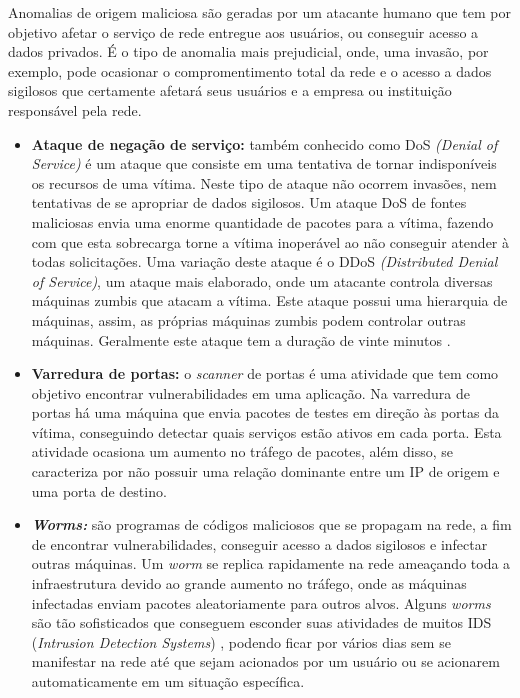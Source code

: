   \indent Anomalias de origem maliciosa são geradas por um atacante humano que tem por objetivo afetar o serviço de rede entregue aos usuários, ou conseguir acesso a dados privados. É o tipo de anomalia mais prejudicial, onde, uma invasão, por exemplo, pode ocasionar o compromentimento total da rede e o acesso a dados sigilosos que certamente afetará seus usuários e a empresa ou instituição responsável pela rede.
  \begin{itemize}
  \item \textbf{Ataque de negação de serviço:} também conhecido como DoS \textit{(Denial of Service)} é um ataque que consiste em uma tentativa de tornar indisponíveis os recursos de uma vítima. Neste tipo de ataque não ocorrem invasões, nem tentativas de se apropriar de dados sigilosos. Um ataque DoS de fontes maliciosas envia uma enorme quantidade de pacotes para a vítima, fazendo com que esta sobrecarga  torne a vítima inoperável ao não conseguir atender à todas solicitações. Uma variação deste ataque é o DDoS \textit{(Distributed Denial of Service)}, um ataque mais elaborado, onde um atacante controla diversas máquinas zumbis que atacam a vítima. Este ataque possui uma hierarquia de máquinas, assim, as próprias máquinas zumbis podem controlar outras máquinas. Geralmente este ataque tem a duração de vinte minutos \cite{Lakhina:2004}.
  \item \textbf{Varredura de portas:} o \textit{scanner} de portas é uma atividade que tem como objetivo encontrar vulnerabilidades em uma aplicação. Na varredura de portas há uma máquina que envia pacotes de testes em direção às portas da vítima, conseguindo detectar quais serviços estão ativos em cada porta. Esta atividade ocasiona um aumento no tráfego de pacotes, além disso, se caracteriza por não possuir uma relação dominante entre um IP de origem e uma porta de destino.
  \item \textbf{\textit{Worms:}} são programas de códigos maliciosos que se propagam na rede, a fim de encontrar vulnerabilidades, conseguir acesso a dados sigilosos e infectar outras máquinas. Um \textit{worm} se replica rapidamente na rede ameaçando toda a infraestrutura devido ao grande aumento no tráfego, onde as máquinas infectadas enviam pacotes aleatoriamente para outros alvos. Alguns \textit{worms} são tão sofisticados que conseguem esconder suas atividades de muitos IDS (\textit{Intrusion Detection Systems}) \cite{Bhuyan}, podendo ficar por vários dias sem se manifestar na rede até que sejam acionados por um usuário ou se acionarem automaticamente em um situação específica.

\end{itemize}
